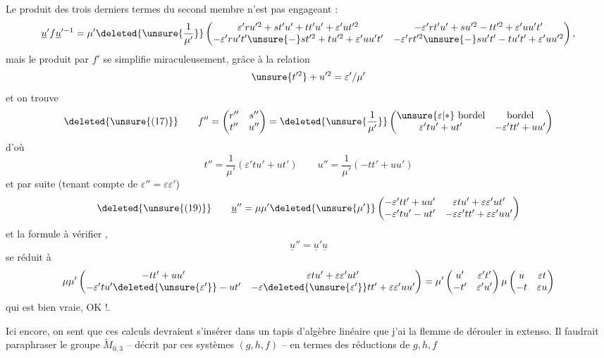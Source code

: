 Le produit des trois derniers termes du second membre n'est pas engageant :
\[
\underline{u}'f\underline{u}'^{-1}
=\mu'\deleted{\unsure{\frac{1}{\mu'}}}
\begin{pmatrix}
\varepsilon'ru'^2+st'u'+tt'u'+\varepsilon'ut'^2
&-\varepsilon'rt'u'+su'^2-tt'^2+\varepsilon'uu't'\\
-\varepsilon'ru't'\unsure{-}st'^2+tu'^2+\varepsilon'uu't'
&-\varepsilon'rt'^2\unsure{-}su't'-tu't'+\varepsilon'uu'^2
\end{pmatrix},
\]
mais le produit par $f'$ se simplifie miraculeusement, grâce à la relation
\[
\unsure{t'^2}+u'^2=\varepsilon'/\mu'
\]
et on trouve
\[
\deleted{\unsure{(17)}}\qquad
f''=\begin{pmatrix}r''&s''\\t''&u''\end{pmatrix}
=\deleted{\unsure{\frac{1}{\mu'}}}
\begin{pmatrix}
\unsure{\varepsilon|*}\ \text{bordel}&\text{bordel}\\
\varepsilon'tu'+ut'&-\varepsilon'tt'+uu'
\end{pmatrix}
\]
d'où
\[
\tag{18}
t''=\frac{1}{\mu'}(\varepsilon'tu'+ut')
\qquad
u''=\frac{1}{\mu'}(-tt'+uu')
\]
et par suite (tenant compte de  $\varepsilon''=\varepsilon\varepsilon'$)
\[
\deleted{\unsure{(19)}}\qquad
\underline{u}''=\mu\mu'\deleted{\unsure{\mu'}}
\begin{pmatrix}
-\varepsilon'tt'+uu'&\varepsilon tu'+\varepsilon\varepsilon'ut'\\
-\varepsilon'tu'-ut'&-\varepsilon\varepsilon'tt'+\varepsilon\varepsilon'uu'
\end{pmatrix}
\]
et la formule à vérifier ,
\[
\underline{u}''=\underline{u}'\underline{u}
\]
se réduit à
\[
\mu\mu'\begin{pmatrix}
-tt'+uu'&\varepsilon tu'+\varepsilon\varepsilon'ut'\\
-\varepsilon'tu'\deleted{\unsure{\varepsilon'}}-ut'&-\varepsilon\deleted{\unsure{\varepsilon'}}tt'+\varepsilon\varepsilon'uu'
\end{pmatrix}
=\mu'\begin{pmatrix}u'&\varepsilon't'\\-t'&\varepsilon'u'\end{pmatrix}
\mu\begin{pmatrix}u&\varepsilon t\\-t&\varepsilon u\end{pmatrix}
\]
qui est bien vraie, OK !.

Ici encore, on sent que ces calculs devraient s'insérer dans un tapis d'algèbre linéaire que j'ai la flemme de dérouler in extenso. Il faudrait paraphraser le groupe  $\widetilde{M}_{0,3}$ -- décrit par ces systèmes $(g,h,f)$ -- en termes  des réductions de $g,h,f$

